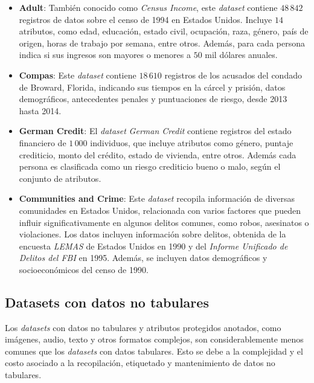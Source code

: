     \begin{itemize}
        \item \textbf{Adult}: Tambi\'en conocido como \emph{Census Income}, este \emph{dataset} contiene $48\,842$ registros de 
        datos sobre el censo de 1994 en Estados Unidos. Incluye $14$ atributos, como edad, educaci\'on, estado civil,
        ocupaci\'on, raza, g\'enero, pa\'is de origen, horas de trabajo por semana, entre otros. Adem\'as, para cada 
        persona indica si sus ingresos son mayores o menores a $50$ mil d\'olares anuales.
        \item \textbf{Compas}: Este \emph{dataset} contiene $18\,610$ registros de los acusados del condado de Broward, Florida,
        indicando sus tiempos en la c\'arcel y prisi\'on, datos demogr\'aficos, antecedentes penales y puntuaciones 
        de riesgo, desde 2013 hasta 2014.
        \item \textbf{German Credit}: El \emph{dataset} \emph{German Credit} contiene registros del estado financiero de $1\,000$ individuos,
        que incluye atributos como g\'enero, puntaje crediticio, monto del cr\'edito, estado de vivienda, entre otros. Adem\'as cada 
        persona es clasificada como un riesgo crediticio bueno o malo, seg\'un el conjunto de atributos.
        \item \textbf{Communities and Crime}: Este \emph{dataset} recopila informaci\'on de diversas comunidades en Estados Unidos, 
        relacionada con varios factores que pueden influir significativamente en algunos delitos comunes, como robos, asesinatos o 
        violaciones. Los datos incluyen informaci\'on sobre delitos, obtenida de la encuesta \emph{LEMAS} de Estados Unidos en 1990 y 
        del \emph{Informe Unificado de Delitos del FBI} en 1995. Adem\'as, se incluyen datos demogr\'aficos y socioecon\'omicos del 
        censo de 1990.

    \end{itemize}

    \subsection{Datasets con datos no tabulares}
    Los \emph{datasets} con datos no tabulares y atributos protegidos anotados, como im\'agenes, audio, texto y otros formatos complejos, 
    son considerablemente menos comunes que los \emph{datasets} con datos tabulares. Esto se debe a la complejidad y el costo asociado a la 
    recopilaci\'on, etiquetado y mantenimiento de datos no tabulares.

